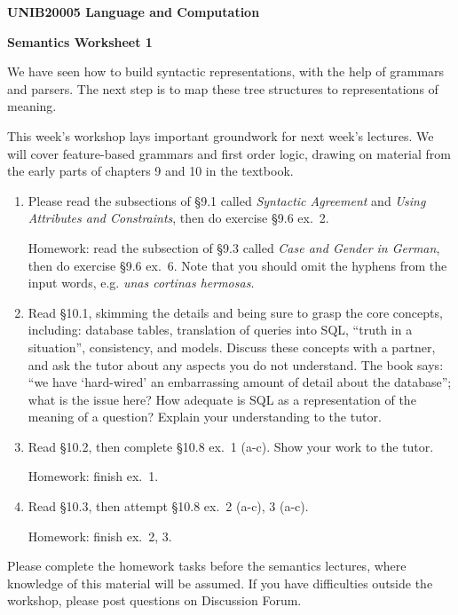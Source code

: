 \documentclass[a4paper,11pt]{article}
\begin{document}
\centerline{\LARGE\bf UNIB20005 Language and Computation}\vspace{2ex}

\centerline{\large\bf Semantics Worksheet 1}\vspace{4ex}

We have seen how to build syntactic representations, with the help of
grammars and parsers.  The next step is to map these tree structures to
representations of meaning.

This week's workshop lays important groundwork for next week's lectures.
We will cover feature-based grammars and first order logic,
drawing on material from the early parts of chapters 9 and 10
in the textbook.

\begin{enumerate}
\item  
  Please read the subsections of \S 9.1 called \emph{Syntactic Agreement}
  and \emph{Using Attributes and Constraints}, then do exercise \S 9.6 ex.~2.

  Homework: read the subsection of \S 9.3 called \emph{Case and
  Gender in German}, then do exercise \S 9.6 ex.~6.  Note that you should
  omit the hyphens from the input words, e.g. \emph{unas cortinas hermosas}.

\item Read \S 10.1, skimming the details and being sure to grasp
  the core concepts, including: database tables, translation of queries into
  SQL, ``truth in a situation'', consistency, and models.  Discuss these
  concepts with a partner, and ask the tutor about any aspects you do
  not understand.
  The book says: ``we have `hard-wired' an embarrassing amount of detail about
  the database''; what is the issue here?  How adequate is SQL as a
  representation of the meaning of a question?  Explain your understanding
  to the tutor.

\item Read \S 10.2, then complete \S 10.8 ex.~1 (a-c).  Show your work
  to the tutor.

  Homework: finish ex.~1. 

\item Read \S 10.3, then attempt \S 10.8 ex.~2 (a-c), 3 (a-c).

  Homework: finish ex.~2, 3.

\end{enumerate}

Please complete the homework tasks before the semantics lectures, where
knowledge of this material will be assumed.
If you have difficulties outside the workshop, please post questions on Discussion Forum.
\end{document}
